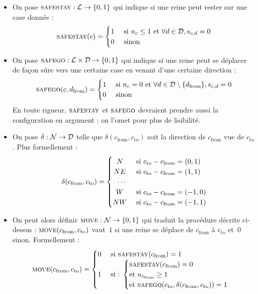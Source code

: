  \begin{itemize}
  \item On pose $\textsc{safestay} : {\mathcal{L}}\to\{0,1\}$ qui indique si une reine peut rester sur une case donnée : \[
 \Ss(c) =
  \begin{cases} 
      \hfill 1    \hfill & \text{ si $n_c\leq 1$ et $\forall d \in \D, s_{c,d}=0$} \\
      \hfill 0 \hfill & \text{ sinon} \\
  \end{cases}
\]
 
  \item On pose $\textsc{safego} :  {\mathcal{L}\times\mathcal{D}}\to\{0,1\}$ qui indique si une reine peut se déplacer de façon sûre vers une certaine case en venant d'une certaine direction : \[
 \Sg(c, d_{\mathrm {from}}) =
  \begin{cases} 
      \hfill 1    \hfill & \text{ si $n_c=0$ et $\forall d \in \D\setminus\{d_{\mathrm{from}}\}, s_{c,d}=0$} \\
      \hfill 0 \hfill & \text{ sinon} \\
  \end{cases}
\]
 En toute rigueur, $\textsc{safestay}$ et $\textsc{safego}$ devraient prendre aussi la configuration en argument : on l'omet pour plus de lisibilité.

  \item On pose $\delta :\mathcal{N}\to\mathcal{D}$ telle que $\delta(c_{\mathrm{from}}, c_{\mathrm{to}})$ soit la direction de $c_{\mathrm{from}}$ vue de $c_{\mathrm{to}}$. Plus formellement : \[
 \delta(c_{\mathrm{from}}, c_{\mathrm{to}}) =
  \begin{cases} 
    \hfill N    \hfill & \text{ si $c_{\mathrm{to}}-c_{\mathrm{from}}=(0,1)$} \\
    \hfill NE \hfill & \text{ si  $c_{\mathrm{to}}-c_{\mathrm{from}}=(1,1)$} \\
    \hfill \cdots & \\
    \hfill W \hfill & \text{ si  $c_{\mathrm{to}}-c_{\mathrm{from}}= (-1,0)$}\\
    \hfill NW \hfill & \text { si  $c_{\mathrm{to}}-c_{\mathrm{from}}=(-1,1)$}\\
  \end{cases}
\] 
  \item On peut alors définir $\textsc{move} :{\mathcal{N}}\to\{0,1\}$ qui traduit la procédure décrite ci-dessus : $\textsc{move}(c_{\mathrm{from}}, c_{\mathrm{to}})$ vaut~$1$ si une reine se déplace de $c_{\mathrm{from}}$ à $c_{\mathrm{to}}$ et~$0$ sinon. Formellement : \[
    \M(c_{\mathrm{from}}, c_{\mathrm{to}}) = 
    \begin{cases}
      \hfill 0 \hfill & \text{ si $\Ss(c_{\mathrm{from}})=1$} \\
      \hfill 1 \hfill & \text{ si : }{ \begin{cases} \Ss(c_{\mathrm{from}})=0 \\\text{et $n_{c_{\mathrm{from}}}\geq 1$} \\ \text{et } \Sg(c_{\mathrm{to}}, \delta(c_{\mathrm{from}}, c_{\mathrm{to}}))=1\\ \end{cases}}\\


\end{cases}\]
\end{itemize}
